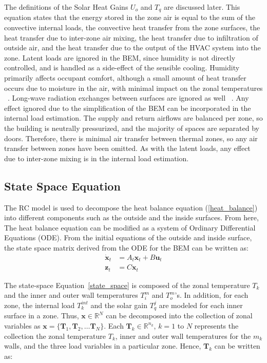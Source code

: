 The definitions of the Solar Heat Gains $U_o$ and $T_q$ are discussed later. This equation states that the energy stored in the zone air is equal to the sum of the convective internal loads, the convective heat transfer from the zone surfaces, the heat transfer due to inter-zone air mixing, the heat transfer due to infiltration of outside air, and the heat transfer due to the output of the HVAC system into the zone.
Latent loads are ignored in the BEM, since humidity is not directly controlled, and is handled as a side-effect of the sensible cooling.  Humidity primarily affects occupant comfort, although a small amount of heat transfer occurs due to moisture in the air, with minimal impact on the zonal temperatures ~\citep{american20132013}.  Long-wave radiation exchanges between surfaces are ignored as well ~\citep{american20132013}.  Any effect ignored due to the simplification of the BEM can be incorporated in the internal load estimation.
The supply and return airflows are balanced per zone, so the building is neutrally pressurized, and the majority of spaces are separated by doors.  Therefore, there is minimal air transfer between thermal zones, so any air transfer between zones have been omitted. As with the latent loads, any effect due to inter-zone mixing is in the internal load estimation.

\subsection{State Space Equation}
\label{problem}
The RC model is used to decompose the heat balance equation (\ref{heat_balance}) into different components such as the outside and the inside surfaces. From here, The heat balance equation can be modified as a system of Ordinary Differential Equations (ODE). From the initial equations of the outside and inside surface, the state space matrix derived from the ODE for the BEM can be written as:
\begin{equation}
\label{state_space}
\begin{array}{ll}
\dot{\textbf{x}}_t &= A_t \textbf{x}_t + B\textbf{u}_t \\
\textbf{z}_t &= C  \textbf{x}_t
\end{array}
\end{equation}

\noindent The state-space Equation~\ref{state_space} is composed of the zonal temperature $T_k$  and the inner and outer wall temperatures $T_i^m$ and $T_o^m$'s. In addition, for each zone, the internal load $T_k^{int}$ and the solar gain $T_q^j$ are modeled for each inner surface in a zone. Thus, $\textbf{x} \in \mathbb{R}^N$ can be decomposed into the collection of zonal variables as $\textbf{x} = \lbrace \textbf{T}_1, \textbf{T}_2, \ldots \textbf{T}_N \rbrace$. Each $\textbf{T}_k \in \mathbb{R}^{n_k}$, $k = 1$ to $N$ represents the collection the zonal temperature $T_k$, inner and outer wall temperatures for the $m_k$ walls, and the three load variables in a particular zone. Hence, $\textbf{T}_k$ can be written as:

